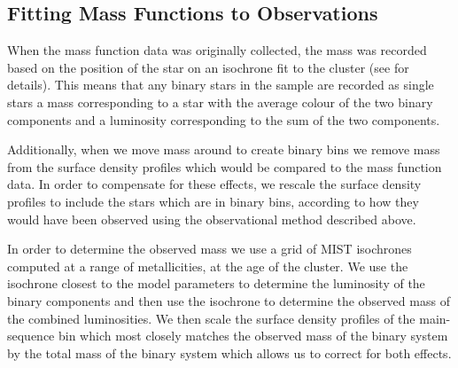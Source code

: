 \subsection{Fitting Mass Functions to Observations}

When the mass function data was originally collected, the mass was recorded based on the position of
the star on an isochrone fit to the cluster (see \citealt{Sollima2017} for details). This means that
any binary stars in the sample are recorded as single stars a mass corresponding to a star with the
average colour of the two binary components and a luminosity corresponding to the sum of the two
components.

Additionally, when we move mass around to create binary bins we remove mass from the surface density
profiles which would be compared to the mass function data. In order to compensate for these
effects, we rescale the surface density profiles to include the stars which are in binary bins,
according to how they would have been observed using the observational method described above.

In order to determine the observed mass we use a grid of MIST isochrones \citep{Dotter2016,Choi2016}
computed at a range of metallicities, at the age of the cluster. We use the isochrone closest to the
model parameters to determine the luminosity of the binary components and then use the isochrone to
determine the observed mass of the combined luminosities. We then scale the surface density profiles
of the main-sequence bin which most closely matches the observed mass of the binary system by the
total mass of the binary system which allows us to correct for both effects.
